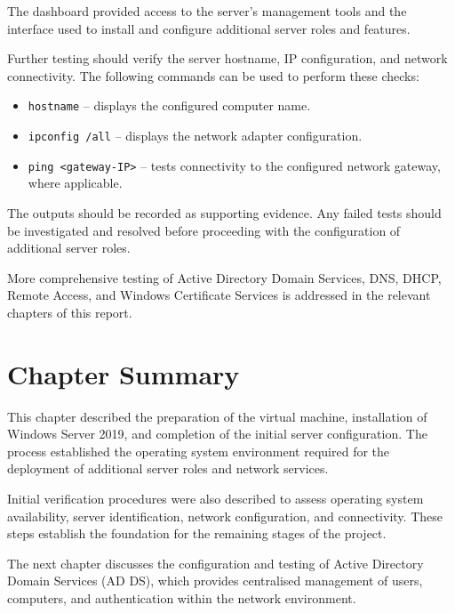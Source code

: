 
The dashboard provided access to the server's management tools and the interface used to install and configure additional server roles and features.

Further testing should verify the server hostname, IP configuration, and network connectivity. The following commands can be used to perform these checks:
\begin{itemize}
  \item \texttt{hostname} -- displays the configured computer name.
  \item \texttt{ipconfig /all} -- displays the network adapter configuration.
  \item \texttt{ping <gateway-IP>} -- tests connectivity to the configured network gateway, where applicable.
\end{itemize}

The outputs should be recorded as supporting evidence. Any failed tests should be investigated and resolved before proceeding with the configuration of additional server roles.

More comprehensive testing of Active Directory Domain Services, DNS, DHCP, Remote Access, and Windows Certificate Services is addressed in the relevant chapters of this report.

\section{Chapter Summary}
\label{sec:install-summary}
This chapter described the preparation of the virtual machine, installation of Windows Server 2019, and completion of the initial server configuration. The process established the operating system environment required for the deployment of additional server roles and network services.

Initial verification procedures were also described to assess operating system availability, server identification, network configuration, and connectivity. These steps establish the foundation for the remaining stages of the project.

The next chapter discusses the configuration and testing of Active Directory Domain Services (AD DS), which provides centralised management of users, computers, and authentication within the network environment.
